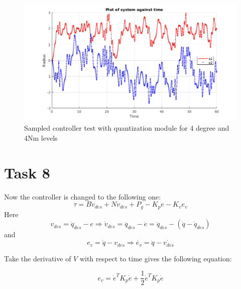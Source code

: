 \documentclass[a4paper,12pt,oneside,onecolumn]{article} %
\begin{document}
\begin{figure}[ht]
    \centering
    \includegraphics[scale=0.4]{quant_4_4.png}
    \caption{Sampled controller test with quantization module for 4 degree and 4Nm levels}
    \label{fig:4}
\end{figure}  




\section*{Task 8}
Now the controller is changed to the following one: 
\begin{equation}
    \tau = B \dot{v}_{des} + N v_{des} + P_g - K_p e - K_v e_v
\end{equation}
Here
\begin{equation}
    v_{des} = \dot{q}_{des} - e \Rightarrow \dot{v}_{des} = \ddot{q}_{des} - \dot{e} =  \ddot{q}_{des} - (\dot{q} - \dot{q}_{des})
\end{equation}
and 
\begin{equation}
    e_v = \dot{q} - v_{des} \Rightarrow \dot{e_v} = \ddot{q} - \dot{v_{des}}
\end{equation}

Take the derivative of $V$ with respect to time gives the following equation:

\begin{equation}
    e_v = \dot{e}^T K_p \dot{e} + \frac{1}{2}\dot{e}^T K_p \dot{e}
\end{equation}
\end{document}
